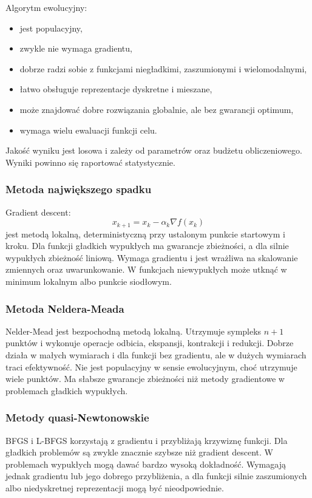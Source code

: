 Algorytm ewolucyjny:
\begin{itemize}
  \item jest populacyjny,
  \item zwykle nie wymaga gradientu,
  \item dobrze radzi sobie z funkcjami niegładkimi, zaszumionymi i wielomodalnymi,
  \item łatwo obsługuje reprezentacje dyskretne i mieszane,
  \item może znajdować dobre rozwiązania globalnie, ale bez gwarancji optimum,
  \item wymaga wielu ewaluacji funkcji celu.
\end{itemize}

Jakość wyniku jest losowa i zależy od parametrów oraz budżetu obliczeniowego. Wyniki powinno się raportować statystycznie.

\subsubsection{Metoda największego spadku}

Gradient descent:
\[
x_{k+1}=x_k-\alpha_k\nabla f(x_k)
\]
jest metodą lokalną, deterministyczną przy ustalonym punkcie startowym i kroku. Dla funkcji gładkich wypukłych ma gwarancje zbieżności, a dla silnie wypukłych zbieżność liniową. Wymaga gradientu i jest wrażliwa na skalowanie zmiennych oraz uwarunkowanie. W funkcjach niewypukłych może utknąć w minimum lokalnym albo punkcie siodłowym.

\subsubsection{Metoda Neldera-Meada}

Nelder-Mead jest bezpochodną metodą lokalną. Utrzymuje sympleks $n+1$ punktów i wykonuje operacje odbicia, ekspansji, kontrakcji i redukcji. Dobrze działa w małych wymiarach i dla funkcji bez gradientu, ale w dużych wymiarach traci efektywność. Nie jest populacyjny w sensie ewolucyjnym, choć utrzymuje wiele punktów. Ma słabsze gwarancje zbieżności niż metody gradientowe w problemach gładkich wypukłych.

\subsubsection{Metody quasi-Newtonowskie}

BFGS i L-BFGS korzystają z gradientu i przybliżają krzywiznę funkcji. Dla gładkich problemów są zwykle znacznie szybsze niż gradient descent. W problemach wypukłych mogą dawać bardzo wysoką dokładność. Wymagają jednak gradientu lub jego dobrego przybliżenia, a dla funkcji silnie zaszumionych albo niedyskretnej reprezentacji mogą być nieodpowiednie.

